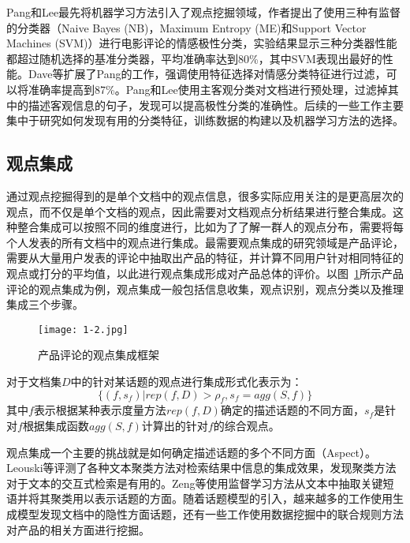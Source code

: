 Pang和Lee最先将机器学习方法引入了观点挖掘领域，作者提出了使用三种有监督的分类器（Naive Bayes (NB)，Maximum Entropy (ME)和Support Vector Machines (SVM)）进行电影评论的情感极性分类，实验结果显示三种分类器性能都超过随机选择的基准分类器，平均准确率达到80\%，其中SVM表现出最好的性能。Dave等扩展了Pang的工作，强调使用特征选择对情感分类特征进行过滤，可以将准确率提高到87\%。Pang和Lee使用主客观分类对文档进行预处理，过滤掉其中的描述客观信息的句子，发现可以提高极性分类的准确性。后续的一些工作主要集中于研究如何发现有用的分类特征，训练数据的构建以及机器学习方法的选择。

\subsection{观点集成}
\label{ch_integrate}
通过观点挖掘得到的是单个文档中的观点信息，很多实际应用关注的是更高层次的观点，而不仅是单个文档的观点，因此需要对文档观点分析结果进行整合集成。这种整合集成可以按照不同的维度进行，比如为了了解一群人的观点分布，需要将每个人发表的所有文档中的观点进行集成。最需要观点集成的研究领域是产品评论，需要从大量用户发表的评论中抽取出产品的特征，并计算不同用户针对相同特征的观点或打分的平均值，以此进行观点集成形成对产品总体的评价。以图~\ref{fig1-2}所示产品评论的观点集成为例，观点集成一般包括信息收集，观点识别，观点分类以及推理集成三个步骤。
\begin{figure}[htp]
\centering
\texttt{[image: 1-2.jpg]}
\caption{产品评论的观点集成框架}
\label{fig1-2}
\end{figure}

对于文档集$ D $中的针对某话题的观点进行集成形式化表示为：
\begin{equation}
\{(f,s_f)|rep(f,D)>\rho_f,s_f=agg(S,f)\}
\end{equation}
其中$ f $表示根据某种表示度量方法$ rep(f,D) $确定的描述话题的不同方面，$ s_f $是针对$ f $根据集成函数$ agg(S,f) $计算出的针对$ f $的综合观点。

观点集成一个主要的挑战就是如何确定描述话题的多个不同方面（Aspect）。Leouski等评测了各种文本聚类方法对检索结果中信息的集成效果，发现聚类方法对于文本的交互式检索是有用的。Zeng等使用监督学习方法从文本中抽取关键短语并将其聚类用以表示话题的方面。随着话题模型的引入，越来越多的工作使用生成模型发现文档中的隐性方面话题，还有一些工作使用数据挖掘中的联合规则方法对产品的相关方面进行挖掘。

